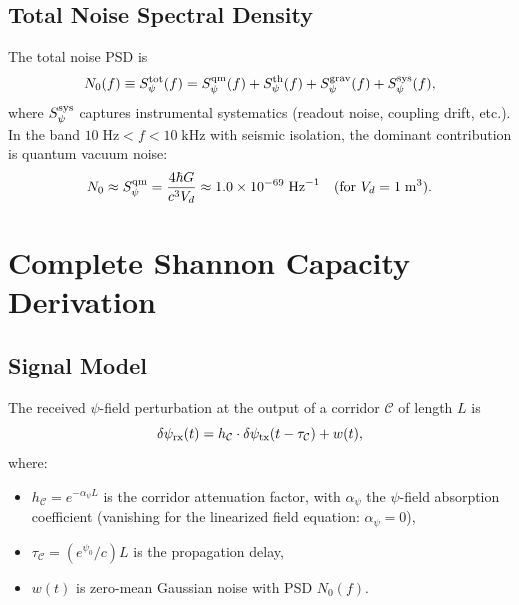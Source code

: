 \documentclass[twocolumn,superscriptaddress,prd,nofootinbib]{revtex4-2}
\newcommand{\Corridor}{\mathcal{C}}
\begin{document}
\subsection{Total Noise Spectral Density}

The total noise PSD is
\begin{equation}
N_0(f) \equiv S_\psi^{\rm tot}(f) = S_\psi^{\rm qm}(f) + S_\psi^{\rm th}(f)
+ S_\psi^{\rm grav}(f) + S_\psi^{\rm sys}(f),
\label{eq:N0-total}
\end{equation}
where $S_\psi^{\rm sys}$ captures instrumental systematics (readout
noise, coupling drift, etc.). In the band $10\;\text{Hz} < f < 10\;\text{kHz}$
with seismic isolation, the dominant contribution is quantum vacuum noise:
\begin{equation}
N_0 \approx S_\psi^{\rm qm} = \frac{4\hbar G}{c^3 V_d}
\approx 1.0\times 10^{-69}\;\text{Hz}^{-1}\quad\text{(for }V_d = 1\;\text{m}^3\text{)}.
\end{equation}

\section{Complete Shannon Capacity Derivation}\label{sec:capacity}

\subsection{Signal Model}

The received $\psi$-field perturbation at the output of a corridor
$\Corridor$ of length $L$ is
\begin{equation}
\delta\psi_{\rm rx}(t) = h_\Corridor \cdot \delta\psi_{\rm tx}(t - \tau_\Corridor)
+ w(t),
\label{eq:signal-model}
\end{equation}
where:
\begin{itemize}
\item $h_\Corridor = e^{-\alpha_\psi L}$ is the corridor attenuation
factor, with $\alpha_\psi$ the $\psi$-field absorption coefficient
(vanishing for the linearized field equation: $\alpha_\psi = 0$),
\item $\tau_\Corridor = (e^{\psi_0}/c)L$ is the propagation delay,
\item $w(t)$ is zero-mean Gaussian noise with PSD $N_0(f)$.
\end{itemize}
\end{document}
